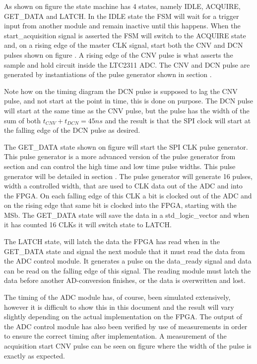 As shown on figure  the state machine has 4 states, namely IDLE, ACQUIRE, GET\_DATA and LATCH. In the IDLE state the FSM will wait for a trigger input from another module and remain inactive until this happens. When the start\_acquisition signal is asserted the FSM will switch to the ACQUIRE state and, on a rising edge of the master CLK signal, start both the CNV and DCN pulses shown on figure . A rising edge of the CNV pulse is what asserts the sample and hold circuit inside the LTC2311 ADC. The CNV and DCN pulse are generated by instantiations of the pulse generator shown in section .

Note how on the timing diagram the DCN pulse is supposed to lag the CNV pulse, and not start at the point in time, this is done on purpose. The DCN pulse will start at the same time as the CNV pulse, but the pulse has the width of the sum of both $t_{CNV} + t_{DCN} = 45 ns$ and the result is that the SPI clock will start at the falling edge of the DCN pulse as desired.  

The GET\_DATA state shown on figure  will start the SPI CLK pulse generator. This pulse generator is a more advanced version of the pulse generator from section  and can control the high time and low time pulse widths. This pulse generator will be detailed in section . The pulse generator will generate 16 pulses, width a controlled width, that are used to CLK data out of the ADC and into the FPGA. On each falling edge of this CLK a bit is clocked out of the ADC and on the rising edge that same bit is clocked into the FPGA, starting with the MSb. The GET\_DATA state will save the data in a std\_logic\_vector and when it has counted 16 CLKs it will switch state to LATCH.

The LATCH state, will latch the data the FPGA has read when in the GET\_DATA state and signal the next module that it must read the data from the ADC control module. It generates a pulse on the data\_ready signal and data can be read on the falling edge of this signal. The reading module must latch the data before another AD-conversion finishes, or the data is overwritten and lost.

The timing of the ADC module has, of course, been simulated extensively, however it is difficult to show this in this document and the result will vary slightly depending on the actual implementation on the FPGA. The output of the ADC control module has also been verified by use of measurements in order to ensure the correct timing after implementation. A measurement of the acquisition start CNV pulse can be seen on figure  where the width of the pulse is exactly  as expected. 

